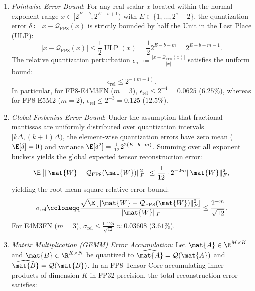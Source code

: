 \begin{theorem}
\begin{enumerate}
    \item \emph{Pointwise Error Bound}: For any real scalar $x$ located within the normal exponent range $x \in [2^{E - b}, 2^{E - b + 1})$ with $E \in \{1, \dots, 2^e - 2\}$, the quantization error $\delta \coloneqq x - \mathcal{Q}_{\text{FP8}}(x)$ is strictly bounded by half the Unit in the Last Place (ULP):
    \begin{equation}
    |x - \mathcal{Q}_{\text{FP8}}(x)| \le \frac{1}{2} \operatorname{ULP}(x) = \frac{1}{2} 2^{E - b - m} = 2^{E - b - m - 1}.
    \label{app:eq:fp8_pointwise_ulp}
    \end{equation}
    The relative quantization perturbation $\epsilon_{\text{rel}} \coloneqq \frac{|x - \mathcal{Q}_{\text{FP8}}(x)|}{|x|}$ satisfies the uniform bound:
    \begin{equation}
    \epsilon_{\text{rel}} \le 2^{-(m + 1)}.
    \label{eq:fp8_pointwise_relative}
    \end{equation}
    In particular, for FP8-E4M3FN ($m=3$), $\epsilon_{\text{rel}} \le 2^{-4} = 0.0625$ ($6.25\%$), whereas for FP8-E5M2 ($m=2$), $\epsilon_{\text{rel}} \le 2^{-3} = 0.125$ ($12.5\%$).
    \item \emph{Global Frobenius Error Bound}: Under the assumption that fractional mantissas are uniformly distributed over quantization intervals $[k \Delta, (k+1) \Delta)$, the element-wise quantization errors have zero mean ($\E[\delta] = 0$) and variance $\E[\delta^2] = \frac{1}{12} 2^{2(E - b - m)}$.
    Summing over all exponent buckets yields the global expected tensor reconstruction error:
    \begin{equation}
    \E\left[ \|\mat{W} - \mathcal{Q}_{\text{FP8}}(\mat{W})\|_F^2 \right] \le \frac{1}{12} \cdot 2^{-2m} \|\mat{W}\|_F^2,
    \label{app:eq:fp8_global_frobenius_bound}
    \end{equation}
    yielding the root-mean-square relative error bound:
    \begin{equation}
    \sigma_{\text{rel}} \coloneqq \frac{\sqrt{\E\left[ \|\mat{W} - \mathcal{Q}_{\text{FP8}}(\mat{W})\|_F^2 \right]}}{\|\mat{W}\|_F} \le \frac{2^{-m}}{\sqrt{12}}.
    \label{eq:fp8_rms_bound}
    \end{equation}
    For E4M3FN ($m=3$), $\sigma_{\text{rel}} \le \frac{0.125}{\sqrt{12}} \approx 0.03608$ ($3.61\%$).
    \item \emph{Matrix Multiplication (GEMM) Error Accumulation}: Let $\mat{A} \in \R^{M \times K}$ and $\mat{B} \in \R^{K \times N}$ be quantized to $\widehat{\mat{A}} = \mathcal{Q}(\mat{A})$ and $\widehat{\mat{B}} = \mathcal{Q}(\mat{B})$. In an FP8 Tensor Core accumulating inner products of dimension $K$ in FP32 precision, the total reconstruction error satisfies:

\end{enumerate}
\end{theorem}
